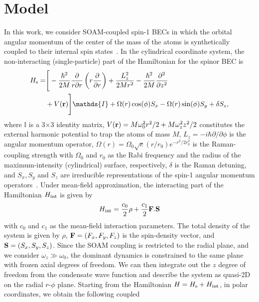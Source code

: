 \documentclass[pra,twocolumn,aps,superscriptaddress,showpacs,longbibliography]{revtex4-1}
\begin{document}
\section{Model}
\label{Sec-II}
In this work, we consider SOAM-coupled 
spin-1 BECs in which the orbital angular momentum of the center of the mass of the atoms is synthetically coupled to their internal spin 
states~\cite{chen2018spin,zhang2019ground}. In the cylindrical coordinate system, the non-interacting (single-particle) part 
of the Hamiltonian for the spinor BEC is~\cite{chen2018spin,chen2018rotating}
\begin{align}
\label{single_pa}
H_{\rm s}=&\Bigg[-\frac{\hbar^2}{2M}\frac{\partial}{r \partial r}
        \left(r\frac{\partial}{\partial r}\right)+
        \frac{L_z^2}{2M r^2}-\frac{\hbar^2}{2M}
        \frac{\partial^2}{\partial z^2}\\
       & + V({\bf r})\Bigg]\mathds{I} 
+ {\Omega(r) \cos(\phi) S_x-\Omega(r)\sin(\phi)S_y+\delta S_z},\nonumber
\end{align}
where $\mathds{I}$ is a 3$\times$3 identity matrix, $V({\bf r}) = M \omega_0^2 r^2/2+M\omega_z^2 z^2/2$ constitutes the external harmonic 
potential to trap the atoms of mass $M$, $L_z=-i \hbar \partial/\partial\phi$ is the angular momentum operator,
$\Omega(r) = \Omega_0 \sqrt{e}(r/r_0)e^{-r^2/2 r_0^2}$ is the Raman-coupling strength 
with $\Omega_0$ and $r_0$ as the Rabi frequency and the radius of the maximum-intensity (cylindrical) surface, respectively,
$\delta$ is the Raman detuning, and $S_x, S_y$ and $S_z$ are irreducible representations of the spin-1 angular momentum
operators~\cite{chen2018spin,chen2018rotating}. Under mean-field approximation, the interacting part of the  Hamiltonian $H_{\rm  int}$
is given by \cite{kawaguchi2012spinor}
{\begin{equation}
H_{\rm int} = \frac{c_0}{2} \rho+
\frac{c_1}{2} {\bf F}.{\bf S}
\label{int_h}
\end{equation}}
with $c_0$ and $c_1$ as the mean-field interaction parameters.
The total density of the system is given by $\rho$, ${\bf F} = (F_x, F_y, F_z)$ is the spin-density vector{\color{black}, and ${\bf S}=(S_x,S_y,S_z)$}.
Since the SOAM coupling is restricted to the radial plane, 
and we consider $\omega_z \gg \omega_0$, the dominant dynamics is constrained to the same plane with frozen axial degrees of freedom.
We can then integrate out the $z$ degree of freedom from the condensate wave function 
and describe the system as quasi-2D on the radial $r$-$\phi$ plane. 
Starting from the Hamiltonian $H=H_{\rm s} + H_{\rm int}$, in polar coordinates, we obtain the following coupled 
\end{document}
